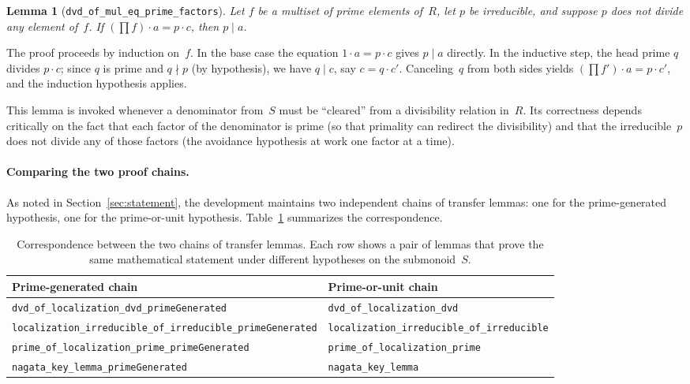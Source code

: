 \documentclass[11pt]{article}
\theoremstyle{plain}
\newtheorem{lemma}[theorem]{Lemma}
\theoremstyle{definition}
\theoremstyle{remark}
\newcommand{\li}[1]{\texorpdfstring{\texttt{#1}}{#1}}
\begin{document}
\begin{lemma}[\li{dvd\_of\_mul\_eq\_prime\_factors}]\label{lem:clear-denom}
Let $f$ be a multiset of prime elements of~$R$, let $p$ be irreducible, and
suppose $p$ does not divide any element of~$f$.  If\/ $(\prod f)\cdot a =
p\cdot c$, then $p\mid a$.
\end{lemma}

\noindent
The proof proceeds by induction on~$f$.  In the base case the equation
$1\cdot a = p\cdot c$ gives $p\mid a$ directly.  In the inductive step, the
head prime $q$ divides $p\cdot c$; since $q$ is prime and $q\nmid p$
(by hypothesis), we have $q\mid c$, say $c=q\cdot c'$.  Canceling~$q$ from
both sides yields $(\prod f')\cdot a = p\cdot c'$, and the induction
hypothesis applies.

This lemma is invoked whenever a denominator from~$S$ must be ``cleared''
from a divisibility relation in~$R$.  Its correctness depends critically on
the fact that each factor of the denominator is prime (so that primality can
redirect the divisibility) and that the irreducible~$p$ does not divide any of
those factors (the avoidance hypothesis at work one factor at a time).

\paragraph{Comparing the two proof chains.}
As noted in Section~\ref{sec:statement}, the development maintains two
independent chains of transfer lemmas: one for the prime-generated hypothesis,
one for the prime-or-unit hypothesis.  Table~\ref{tab:chains} summarizes the
correspondence.

\begin{table}[ht]
\centering
\caption{Correspondence between the two chains of transfer lemmas.  Each row
shows a pair of lemmas that prove the same mathematical statement under
different hypotheses on the submonoid~$S$.}\label{tab:chains}
\smallskip
{\small
\begin{tabular}{@{}p{6.4cm}p{5.4cm}@{}}
\toprule
\textbf{Prime-generated chain} & \textbf{Prime-or-unit chain} \\
\midrule
\li{dvd\_of\_localization\_dvd\_\allowbreak{}primeGenerated}
  & \li{dvd\_of\_localization\_dvd} \\[3pt]
\li{localization\_irreducible\_\allowbreak{}of\_irreducible\_primeGenerated}
  & \li{localization\_irreducible\_\allowbreak{}of\_irreducible} \\[3pt]
\li{prime\_of\_localization\_prime\_\allowbreak{}primeGenerated}
  & \li{prime\_of\_localization\_\allowbreak{}prime} \\[3pt]
\li{nagata\_key\_lemma\_\allowbreak{}primeGenerated}
  & \li{nagata\_key\_lemma} \\
\bottomrule
\end{tabular}
}
\end{table}
\end{document}
